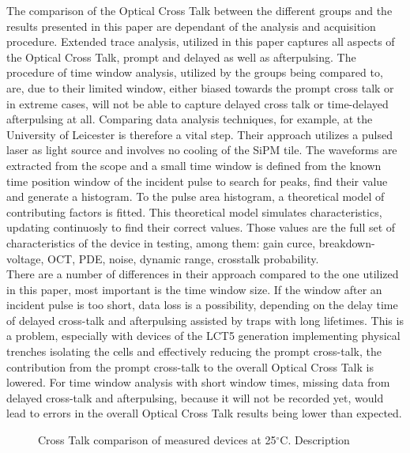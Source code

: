 \documentclass[12pt,article,type=msc,colorback,accentcolor=tud9c]{tudthesis}
\begin{document}
The comparison of the Optical Cross Talk between the different groups and the results presented in this paper are dependant of the analysis and acquisition procedure. Extended trace analysis, utilized in this paper captures all aspects of the Optical Cross Talk, prompt and delayed as well as afterpulsing. The procedure of time window analysis, utilized by the groups being compared to, are, due to their limited window, either biased towards the prompt cross talk or in extreme cases, will not be able to capture delayed cross talk or time-delayed afterpulsing at all. Comparing data analysis techniques, for example, at the University of Leicester is therefore a vital step. Their approach utilizes a pulsed laser as light source and involves no cooling of the SiPM tile. The waveforms are extracted from the scope and a small time window is defined from the known time position window of the incident pulse to search for peaks, find their value and generate a histogram. To the pulse area histogram, a theoretical model of contributing factors is fitted. This theoretical model simulates characteristics, updating continuosly to find their correct values. Those values are the full set of characteristics of the device in testing, among them: gain curce, breakdown-voltage, OCT, PDE, noise, dynamic range, crosstalk probability.\\
There are a number of differences in their approach compared to the one utilized in this paper, most important is the time window size. If the window after an incident pulse is too short, data loss is a possibility, depending on the delay time of delayed cross-talk and afterpulsing assisted by traps with long lifetimes. This is a problem, especially with devices of the LCT5 generation implementing physical trenches isolating the cells and effectively reducing the prompt cross-talk, the contribution from the prompt cross-talk to the overall Optical Cross Talk is lowered. For time window analysis with short window times, missing data from delayed cross-talk and afterpulsing, because it will not be recorded yet, would lead to errors in the overall Optical Cross Talk results being lower than expected.\\



\begin{figure}[h]
\begin{centering}
\caption{Cross Talk comparison of measured devices at 25$^\circ$C. Description}
\label{fig:DC_OCT}
\end{centering}
\end{figure}
\end{document}
